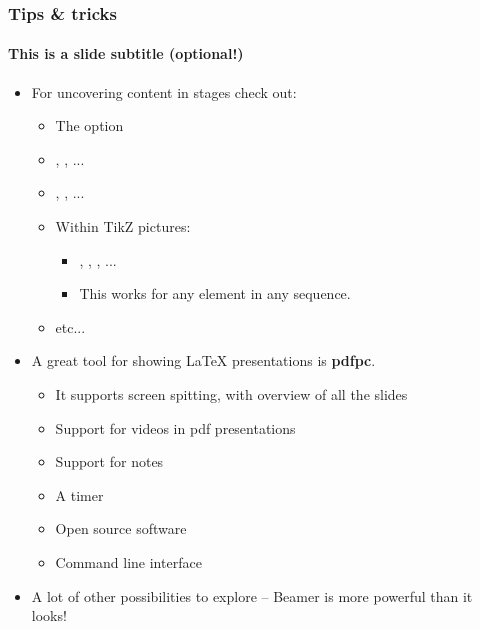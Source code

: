 \documentclass[usenames,dvipsnames]{beamer}
\begin{document}
\begin{frame}[t]
\frametitle{Tips \& tricks}
\framesubtitle{This is a slide subtitle (optional!)}

\begin{itemize}
  \item For uncovering content in stages check out:
  \begin{itemize}
    \item The  option
    \item {}, , ...
    \item {}, , ...
    \item \vspace{0.2em}Within TikZ pictures:
    \begin{itemize}
      \item {}, , , ...
      \item This works for any element in any sequence.
    \end{itemize}
    \item etc...
  \end{itemize}
  \item A great tool for showing {\LaTeX} presentations is \textbf{pdfpc}.
  \begin{itemize}
    \item It supports screen spitting, with overview of all the slides
    \item Support for videos in pdf presentations
    \item Support for notes
    \item A timer
    \item Open source software
    \item Command line interface
  \end{itemize}
  \item A lot of other possibilities to explore -- Beamer is more powerful than it looks!
\end{itemize}

\end{frame}
\end{document}
